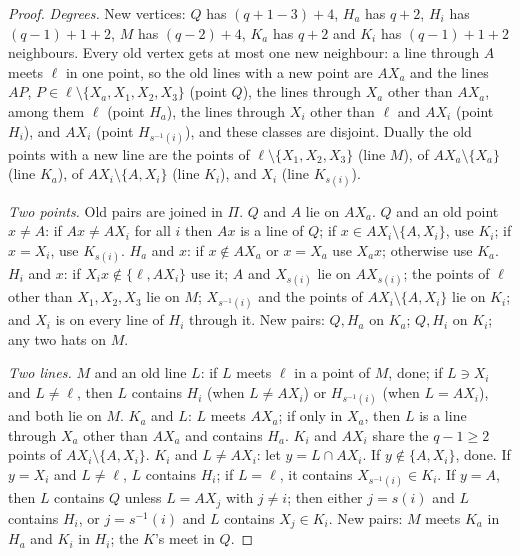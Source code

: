 \begin{proof}
\emph{Degrees.} New vertices: $Q$ has $(q+1-3)+4$, $H_a$ has $q+2$, $H_i$ has $(q-1)+1+2$, $M$ has $(q-2)+4$, $K_a$ has
$q+2$ and $K_i$ has $(q-1)+1+2$ neighbours. Every old vertex gets at most one new neighbour: a line through $A$ meets
$\ell$ in one point, so the old lines with a new point are $AX_a$ and the lines $AP$, $P \in \ell\setminus\{X_a,X_1,X_2,X_3\}$
(point $Q$), the lines through $X_a$ other than $AX_a$, among them $\ell$ (point $H_a$), the lines through $X_i$ other than
$\ell$ and $AX_i$ (point $H_i$), and $AX_i$ (point $H_{s^{-1}(i)}$), and these classes are disjoint. Dually the old
points with a new line are the points of $\ell \setminus \{X_1,X_2,X_3\}$ (line $M$), of $AX_a \setminus \{X_a\}$ (line $K_a$),
of $AX_i \setminus\{A, X_i\}$ (line $K_i$), and $X_i$ (line $K_{s(i)}$).

\emph{Two points.} Old pairs are joined in $\Pi$. $Q$ and $A$ lie on $AX_a$. $Q$ and an old point $x \ne A$: if $Ax \ne AX_i$ for all $i$ then $Ax$ is a line
of $Q$; if $x \in AX_i \setminus \{A, X_i\}$, use $K_i$; if $x = X_i$, use $K_{s(i)}$. $H_a$ and $x$: if $x \notin AX_a$ or
$x = X_a$ use $X_ax$; otherwise use $K_a$. $H_i$ and $x$: if $X_ix \notin \{\ell, AX_i\}$ use it; $A$ and $X_{s(i)}$ lie on
$AX_{s(i)}$; the points of $\ell$ other than $X_1,X_2,X_3$ lie on $M$; $X_{s^{-1}(i)}$ and the points of
$AX_i \setminus\{A,X_i\}$ lie on $K_i$; and $X_i$ is on every line of $H_i$ through it. New pairs: $Q, H_a$ on $K_a$;
$Q, H_i$ on $K_i$; any two hats on $M$.

\emph{Two lines.} $M$ and an old line $L$: if $L$ meets $\ell$ in a point of $M$, done; if $L \ni X_i$ and $L \ne \ell$, then
$L$ contains $H_i$ (when $L \ne AX_i$) or $H_{s^{-1}(i)}$ (when $L = AX_i$), and both lie on $M$. $K_a$ and $L$: $L$ meets
$AX_a$; if only in $X_a$, then $L$ is a line through $X_a$ other than $AX_a$ and contains $H_a$. $K_i$ and $AX_i$ share the $q-1 \ge 2$ points of $AX_i \setminus \{A, X_i\}$. $K_i$ and $L \ne AX_i$:
let $y = L \cap AX_i$. If $y \notin \{A, X_i\}$, done. If $y = X_i$ and $L \ne \ell$, $L$ contains $H_i$; if $L = \ell$, it
contains $X_{s^{-1}(i)} \in K_i$. If $y = A$, then $L$ contains $Q$ unless $L = AX_j$ with $j \ne i$; then either
$j = s(i)$ and $L$ contains $H_i$, or $j = s^{-1}(i)$ and $L$ contains $X_j \in K_i$. New pairs: $M$ meets $K_a$ in $H_a$
and $K_i$ in $H_i$; the $K$'s meet in $Q$.
\end{proof}

